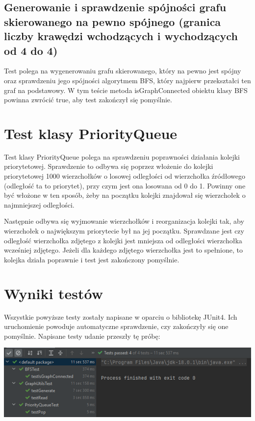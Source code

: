 \documentclass[11pt,a4paper]{report}
\def\console #1{\begingroup\fontfamily{qcr}\selectfont#1\endgroup}
\begin{document}
	\vspace{2em}
	
	\subsection{Generowanie i sprawdzenie spójności grafu skierowanego na pewno spójnego (granica liczby krawędzi wchodzących i wychodzących od 4 do 4)}
	
	Test polega na wygenerowaniu grafu skierowanego, który na pewno jest spójny oraz sprawdzeniu jego spójności algorytmem BFS, który najpierw przekształci ten graf na podstawowy. 
	W tym teście metoda \console{isGraphConnected} obiektu klasy \console{BFS} powinna zwrócić \console{true}, aby test zakończył się pomyślnie.
	
	\newpage
	\section{Test klasy PriorityQueue}
	
	Test klasy PriorityQueue polega na sprawdzeniu poprawności działania kolejki priorytetowej.
	Sprawdzenie to odbywa się poprzez włożenie do kolejki priorytetowej 1000 wierzchołków o losowej odległości od wierzchołka źródłowego 
	(odległość ta to priorytet), przy czym jest ona losowana od 0 do 1. Powinny one być włożone w ten sposób,
	żeby na początku kolejki znajdował się wierzchołek o najmniejszej odległości. 
	
	Następnie odbywa się wyjmowanie wierzchołków i reorganizacja kolejki tak, 
	aby wierzchołek o największym priorytecie był na jej początku. 
	Sprawdzane jest czy odległość wierzchołka zdjętego z kolejki jest mniejsza od odległości wierzchołka wcześniej zdjętego.
	Jeżeli dla każdego zdjętego wierzchołka jest to spełnione, to kolejka działa poprawnie i test jest zakończony pomyślnie.
	
	\vspace{2em}
	\section{Wyniki testów}
	
	Wszystkie powyższe testy zostały napisane w oparciu o bibliotekę \console{JUnit4}. Ich uruchomienie powoduje automatyczne sprawdzenie, czy zakończyły się one pomyślnie.
	Napisane testy udanie przeszły tę próbę:
	
	\begin{center}
        \includegraphics[width=\textwidth]{test_results.png}
    \end{center}
\end{document}
